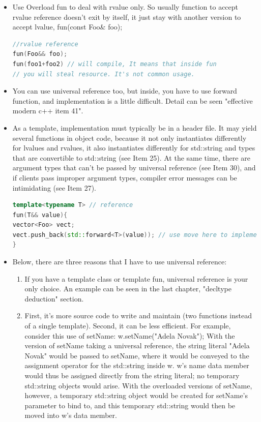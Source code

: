 \documentclass[a4paper,12pt,twoside]{book}
\begin{document}
\begin{itemize}
\item Use Overload fun to deal with rvalue only. So usually function to accept rvalue reference doesn't exit by itself, it just stay with another version to accept lvalue, fun(const Foo\& foo);
\begin{lstlisting}[frame=single, language=c++]
//rvalue reference
fun(Foo&& foo);
fun(foo1+foo2) // will compile, It means that inside fun
// you will steal resource. It's not common usage.
\end{lstlisting}

\item You can use universal reference too,  but inside, you have to use forward function, and implementation is a little difficult.  Detail can be seen "effective modern c++ item 41".

\item As a template, implementation must typically be in a header file. It may yield several functions in object code, because it not only instantiates differently for lvalues and rvalues, it also instantiates differently for std::string and types that are convertible to std::string (see Item 25). At the same time, there are argument types that can't be passed by universal reference (see Item 30), and if clients pass improper argument types, compiler error messages can be intimidating (see Item 27).
\begin{lstlisting}[frame=single, language=c++]
template<typename T> // reference
fun(T&& value){
vector<Foo> vect;
vect.push_back(std::forward<T>(value)); // use move here to implement
}
\end{lstlisting}

\item Below, there are three reasons that I have to use universal reference:
\begin{enumerate}
\item If you have a template class or template fun, universal reference is your only choice. An example can be seen in the last chapter, "decltype deduction" section.

\item First, it's more source code to write and maintain (two functions instead of a single template). Second, it can be less efficient. For example, consider this use of setName:
w.setName("Adela Novak"); With the version of setName taking a universal reference, the string literal "Adela Novak" would be passed to setName, where it would be conveyed to the assignment
operator for the std::string inside w. w's name data member would thus be assigned
directly from the string literal; no temporary std::string objects would arise. With
the overloaded versions of setName, however, a temporary std::string object
would be created for setName's parameter to bind to, and this temporary
std::string would then be moved into w's data member.


\end{enumerate}
\end{itemize}
\end{document}
